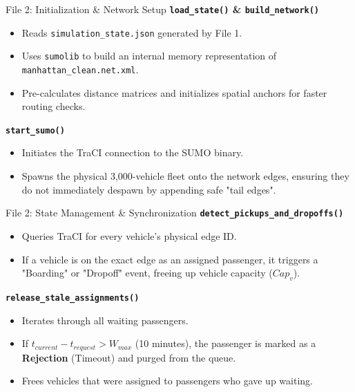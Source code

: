 \documentclass{beamer}
\begin{document}
\begin{frame}{File 2: Initialization \& Network Setup}
  \textbf{\texttt{load\_state()} \& \texttt{build\_network()}}
  \begin{itemize}
      \item Reads \texttt{simulation\_state.json} generated by File 1.
      \item Uses \texttt{sumolib} to build an internal memory representation of \texttt{manhattan\_clean.net.xml}.
      \item Pre-calculates distance matrices and initializes spatial anchors for faster routing checks.
  \end{itemize}
  \vspace{0.3cm}
  \textbf{\texttt{start\_sumo()}}
  \begin{itemize}
      \item Initiates the TraCI connection to the SUMO binary.
      \item Spawns the physical 3,000-vehicle fleet onto the network edges, ensuring they do not immediately despawn by appending safe "tail edges".
  \end{itemize}
\end{frame}

\begin{frame}{File 2: State Management \& Synchronization}
  \textbf{\texttt{detect\_pickups\_and\_dropoffs()}}
  \begin{itemize}
      \item Queries TraCI for every vehicle's physical edge ID.
      \item If a vehicle is on the exact edge as an assigned passenger, it triggers a "Boarding" or "Dropoff" event, freeing up vehicle capacity ($Cap_v$).
  \end{itemize}
  \vspace{0.3cm}
  \textbf{\texttt{release\_stale\_assignments()}}
  \begin{itemize}
      \item Iterates through all waiting passengers.
      \item If $t_{current} - t_{request} > W_{max}$ (10 minutes), the passenger is marked as a \textbf{Rejection} (Timeout) and purged from the queue.
      \item Frees vehicles that were assigned to passengers who gave up waiting.
  \end{itemize}
\end{frame}
\end{document}
